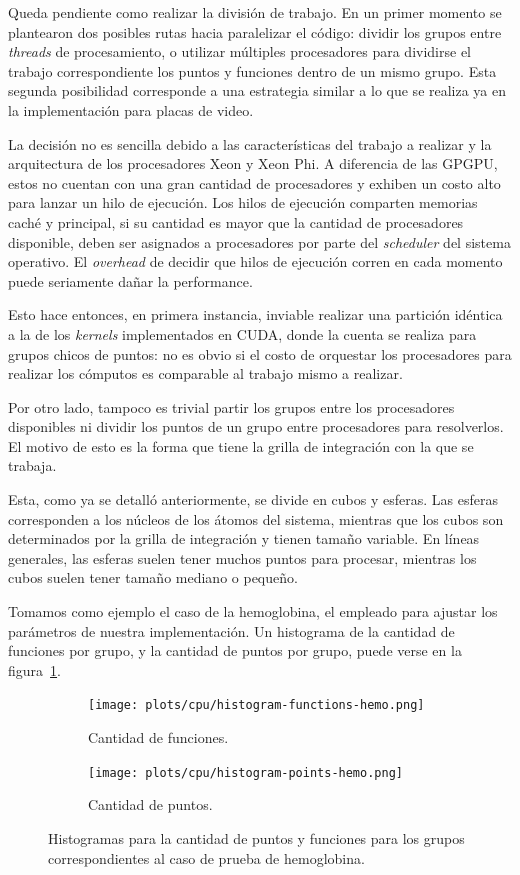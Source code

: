 Queda pendiente como realizar la divisi\'on de trabajo.  En un primer momento se plantearon dos posibles rutas
hacia paralelizar el c\'odigo: dividir los grupos entre \textit{threads} de
procesamiento, o utilizar m\'ultiples procesadores para dividirse el trabajo
correspondiente los puntos y funciones dentro de un mismo grupo. Esta segunda
posibilidad corresponde a una estrategia similar a lo que se realiza ya en la
implementaci\'on para placas de video.

La decisi\'on no es sencilla debido a las caracter\'isticas del trabajo a realizar
y la arquitectura de los procesadores Xeon y Xeon Phi. A diferencia de las GPGPU,
estos no cuentan con una gran cantidad de procesadores y exhiben un costo alto
para lanzar un hilo de ejecuci\'on. Los hilos de ejecuci\'on comparten memorias
cach\'e y principal, si su cantidad es mayor que la cantidad de procesadores disponible,
deben ser asignados a procesadores por parte del \textit{scheduler} del sistema
operativo. El \textit{overhead} de decidir que hilos de ejecuci\'on corren en cada
momento puede seriamente da\~nar la performance.

Esto hace entonces, en primera instancia, inviable realizar una partici\'on id\'entica a
la de los \textit{kernels} implementados en CUDA, donde la cuenta se realiza para
grupos chicos de puntos: no es obvio si el costo de orquestar los procesadores para
realizar los c\'omputos es comparable al trabajo mismo a realizar.

Por otro lado, tampoco es trivial partir los grupos entre los procesadores disponibles
ni dividir los puntos de un grupo entre procesadores para resolverlos.
El motivo de esto es la forma que tiene la grilla de integraci\'on con la que se trabaja.

Esta, como ya se detall\'o anteriormente, se divide en cubos y
esferas. Las esferas corresponden a los n\'ucleos de los \'atomos del sistema,
mientras que los cubos son determinados por la grilla de integraci\'on y tienen tama\~no
variable. En l\'ineas generales, las esferas suelen tener muchos puntos para procesar,
mientras los cubos suelen tener tama\~no mediano o peque\~no.

Tomamos como ejemplo el caso de la hemoglobina, el empleado para ajustar los
par\'ametros de nuestra implementaci\'on. Un histograma de la cantidad de
funciones por grupo, y la cantidad de puntos por grupo, puede verse en la
figura~\ref{fig:lio-histo-groups}.

\begin{figure}[htbp]
   \centering
   \begin{subfigure}[b]{\plotwidthtres}
     \texttt{[image: plots/cpu/histogram-functions-hemo.png]}
     \caption{Cantidad de funciones.}
   \end{subfigure}
   \begin{subfigure}[b]{\plotwidthtres}
     \texttt{[image: plots/cpu/histogram-points-hemo.png]}
     \caption{Cantidad de puntos.}
   \end{subfigure}
   \caption{Histogramas para la cantidad de puntos y funciones para los grupos correspondientes al caso de prueba
   de hemoglobina.}
   \label{fig:lio-histo-groups}
\end{figure}

